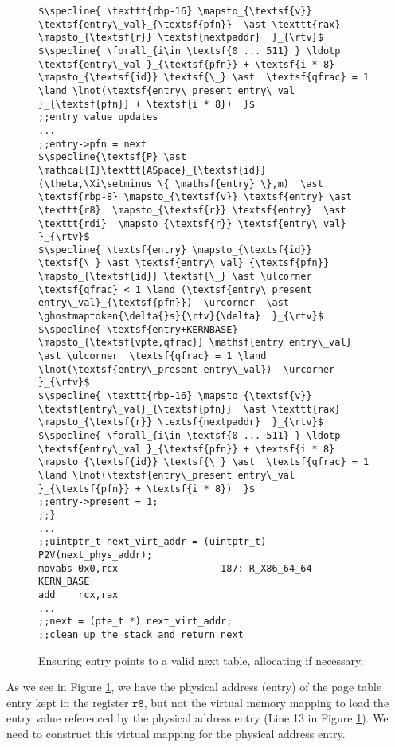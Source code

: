 \begin{figure}
\begin{lstlisting}[mathescape, basicstyle=\tiny]
$\specline{ \texttt{rbp-16} \mapsto_{\textsf{v}} \textsf{entry\_val}_{\textsf{pfn}}  \ast \texttt{rax} \mapsto_{\textsf{r}} \textsf{nextpaddr}  }_{\rtv}$
$\specline{ \forall_{i\in \textsf{0 ... 511} } \ldotp  \textsf{entry\_val }_{\textsf{pfn}} + \textsf{i * 8} \mapsto_{\textsf{id}} \textsf{\_} \ast  \textsf{qfrac} = 1 \land \lnot(\textsf{entry\_present entry\_val }_{\textsf{pfn}} + \textsf{i * 8})  }$
;;entry value updates
...
;;entry->pfn = next
$\specline{\textsf{P} \ast \mathcal{I}\texttt{ASpace}_{\textsf{id}}(\theta,\Xi\setminus \{ \mathsf{entry} \},m)  \ast \textsf{rbp-8} \mapsto_{\textsf{v}} \textsf{entry} \ast \texttt{r8}  \mapsto_{\textsf{r}} \textsf{entry}  \ast \texttt{rdi}  \mapsto_{\textsf{r}} \textsf{entry\_val}  }_{\rtv}$
$\specline{ \textsf{entry} \mapsto_{\textsf{id}} \textsf{\_} \ast \textsf{entry\_val}_{\textsf{pfn}} \mapsto_{\textsf{id}} \textsf{\_} \ast \ulcorner  \textsf{qfrac} < 1 \land (\textsf{entry\_present entry\_val}_{\textsf{pfn}})  \urcorner  \ast \ghostmaptoken{\delta{}s}{\rtv}{\delta}  }_{\rtv}$
$\specline{ \textsf{entry+KERNBASE} \mapsto_{\textsf{vpte,qfrac}} \mathsf{entry entry\_val} \ast \ulcorner  \textsf{qfrac} = 1 \land \lnot(\textsf{entry\_present entry\_val})  \urcorner }_{\rtv}$
$\specline{ \texttt{rbp-16} \mapsto_{\textsf{v}} \textsf{entry\_val}_{\textsf{pfn}}  \ast \texttt{rax} \mapsto_{\textsf{r}} \textsf{nextpaddr}  }_{\rtv}$
$\specline{ \forall_{i\in \textsf{0 ... 511} } \ldotp  \textsf{entry\_val }_{\textsf{pfn}} + \textsf{i * 8} \mapsto_{\textsf{id}} \textsf{\_} \ast  \textsf{qfrac} = 1 \land \lnot(\textsf{entry\_present entry\_val }_{\textsf{pfn}} + \textsf{i * 8})  }$
;;entry->present = 1;
;;}
...
;;uintptr_t next_virt_addr = (uintptr_t) P2V(next_phys_addr);
movabs 0x0,rcx	                187: R_X86_64_64	KERN_BASE
add    rcx,rax
...
;;next = (pte_t *) next_virt_addr;
;;clean up the stack and return next
\end{lstlisting}
\vspace{-1em}
\caption{Ensuring \textsf{entry} points to a valid next table, allocating if necessary.}
\label{fig:calltopteinitialize}
\end{figure}

As we see in Figure \ref{fig:calltopteinitialize}, we have the physical address (\textsf{entry}) of the page table entry kept in the register $\texttt{r8}$, but not the virtual memory mapping to load the entry value referenced by the physical address \textsf{entry} (Line 13 in Figure \ref{fig:calltopteinitialize}). We need to construct this virtual mapping for the physical address \textsf{entry}.
